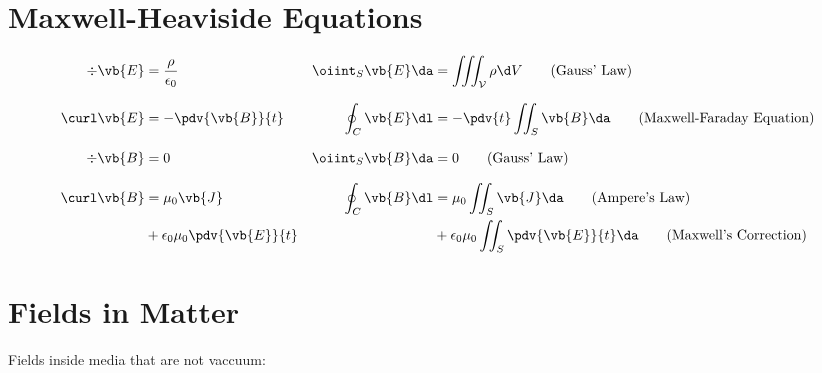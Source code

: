 \section{Maxwell-Heaviside Equations}
\begin{align*}
	\div\vb{E}&=\frac{\rho}{\epsilon_0}
	&
	\oiint_{S}\vb{E}\da&=\iiint_{\mathcal{V}}\rho\d V\tag{Gauss' Law}
	\\[0.25cm]
	\curl\vb{E}&=-\pdv{\vb{B}}{t}
	&
	\oint_{C}\vb{E}\dl&=-\pdv{t}\iint_{S}\vb{B}\da\tag{Maxwell-Faraday Equation}
	\\[0.25cm]
	\div\vb{B}&=0
	&
	\oiint_{S}\vb{B}\da&=0\tag{Gauss' Law}
	\\[0.25cm]
	\curl\vb{B}&=\mu_0\vb{J}
	&
	\oint_{C}\vb{B}\dl&=\mu_0\iint_{S}\vb{J}\da\tag{Ampere's Law}
	\\
	&+\epsilon_0\mu_0\pdv{\vb{E}}{t}&&+\epsilon_0\mu_0\iint_{S}\pdv{\vb{E}}{t}\da\tag{Maxwell's Correction}
\end{align*}
\section{Fields in Matter}
Fields inside media that are not vaccuum:
